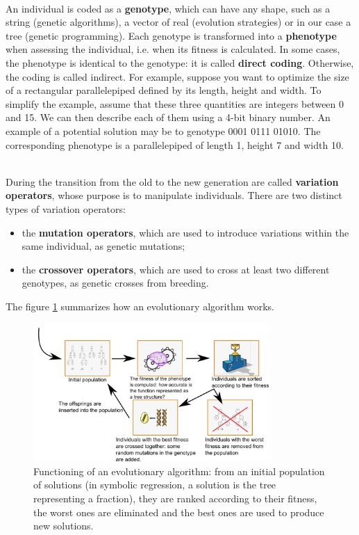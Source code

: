 ~~\\
An individual is coded as a \textbf{genotype}, which can have any shape, such as a string (genetic algorithms), a vector of real (evolution strategies) or in our case a tree (genetic programming). Each genotype is transformed into a \textbf{phenotype} when assessing the individual, i.e. when its fitness is calculated. In some cases, the phenotype is identical to the genotype: it is called \textbf{direct coding}. Otherwise, the coding is called indirect. For example, suppose you want to optimize the size of a rectangular parallelepiped defined by its length, height and width. To simplify the example, assume that these three quantities are integers between 0 and 15. We can then describe each of them using a 4-bit binary number. An example of a potential solution may be to genotype 0001 0111 01010. The corresponding phenotype is a parallelepiped of length 1, height 7 and width 10.

~~\\
During the transition from the old to the new generation are called \textbf{variation operators}, whose purpose is to manipulate individuals. There are two distinct types of variation operators:
\begin{itemize}
	\item the \textbf{mutation operators}, which are used to introduce variations within the same individual, as genetic mutations;
	\item the \textbf{crossover operators}, which are used to cross at least two different genotypes, as genetic crosses from breeding.
\end{itemize}

The figure \ref{fig:algorithmes_evolutionnistes_synopsis} summarizes how an evolutionary algorithm works.

\begin{figure}[htb]
	\centering
		\includegraphics[width=0.8\textwidth]{genetic_programming_regression_synopsis.png}
	\caption[Functioning of an evolutionary algorithm]{Functioning of an evolutionary algorithm: from an initial population of solutions (in symbolic regression, a solution is the tree representing a fraction), they are ranked according to their fitness, the worst ones are eliminated and the best ones are used to produce new solutions.}
	\label{fig:algorithmes_evolutionnistes_synopsis}
\end{figure}

